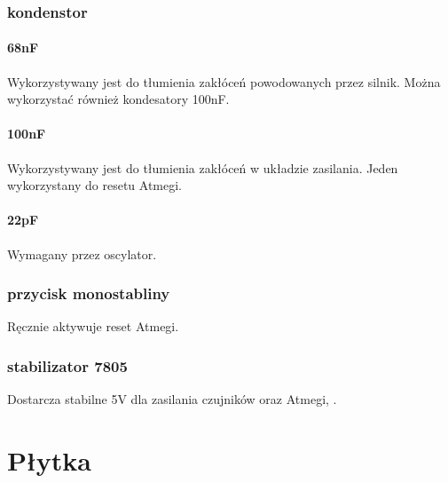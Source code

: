 \documentclass[a4paper,11pt]{article}
\begin{document}
\subsubsection{kondenstor}
\paragraph{68nF}
Wykorzystywany jest do tłumienia zakłóceń powodowanych przez silnik. Można wykorzystać również kondesatory 100nF.
\paragraph{100nF}
Wykorzystywany jest do tłumienia zakłóceń w układzie zasilania. Jeden wykorzystany do resetu Atmegi.
\paragraph{22pF}
Wymagany przez oscylator.
\subsubsection{przycisk monostabliny}
Ręcznie aktywuje reset Atmegi.
\subsubsection{stabilizator 7805}
Dostarcza stabilne 5V dla zasilania czujników oraz Atmegi, .

\section{Płytka}
\end{document}
